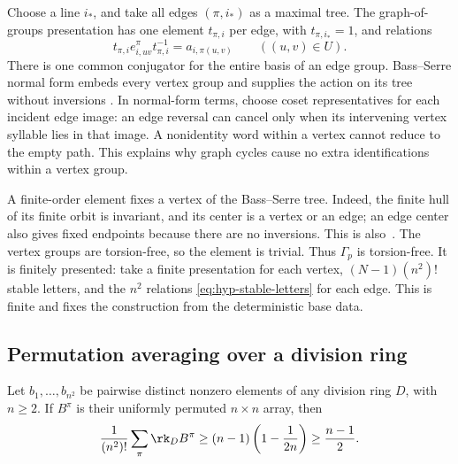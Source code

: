 Choose a line \(i_*\), and take all edges \((\pi,i_*)\) as a maximal
tree. The graph-of-groups presentation has one element \(t_{\pi,i}\)
per edge, with \(t_{\pi,i_*}=1\), and relations
\begin{equation}\label{eq:hyp-stable-letters}
 t_{\pi,i}e_{i,uv}^{\pi}t_{\pi,i}^{-1}=a_{i,\pi(u,v)}
 \qquad ((u,v)\in U).
\end{equation}
There is one common conjugator for the entire basis of an edge group.
Bass--Serre normal form embeds every vertex group and supplies the
action on its tree without inversions
\cite[Theorem~11 and its Corollary~3 in I.5.2, and Theorem~12 in I.5.3]{SerreTrees}. In normal-form
terms, choose coset representatives for each incident edge image:
an edge reversal can cancel only when its intervening vertex syllable
lies in that image. A nonidentity word within a vertex cannot reduce
to the empty path. This explains why graph cycles cause no extra
identifications within a vertex group.

A finite-order element fixes a vertex of the Bass--Serre tree. Indeed,
the finite hull of its finite orbit is invariant, and its center is a
vertex or an edge; an edge center also gives fixed endpoints because
there are no inversions. This is also~\cite[Proposition~19 in I.4.3]{SerreTrees}.
The vertex groups are torsion-free, so the element is trivial. Thus \(\Gamma_p\) is torsion-free.
It is finitely presented: take a finite presentation for each vertex,
\((N-1)(n^2)!\) stable letters, and the \(n^2\) relations
\eqref{eq:hyp-stable-letters} for each edge. This is finite and fixes the
construction from the deterministic base data.

\subsection{Permutation averaging over a division ring}

\begin{lemma}\label{lem:permutation}
Let \(b_1,\ldots,b_{n^2}\) be pairwise distinct nonzero elements of
any division ring \(D\), with \(n\ge2\). If \(B^\pi\) is their
uniformly permuted \(n\times n\) array, then
\begin{equation}\label{eq:permutation-bound}
 \frac1{(n^2)!}\sum_\pi\rk_D B^\pi
 \ge(n-1)\left(1-\frac1{2n}\right)\ge\frac{n-1}{2}.
\end{equation}
\end{lemma}

